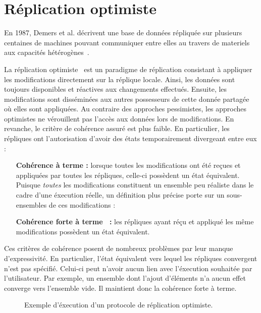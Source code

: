 \section{Réplication optimiste}
\label{repl:sec:optimistic}

En 1987, Demers et al. décrivent une base de données répliquée sur plusieurs
centaines de machines pouvant communiquer entre elles au travers de materiels
aux capacités hétérogènes~\cite{demers1987epidemic}. 

La réplication optimiste~\cite{johnson1975maintenance, saito2005optimistic} est
un paradigme de réplication consistant à appliquer les modifications directement
sur la réplique locale.  Ainsi, les données sont toujours disponibles et
réactives aux changements effectués. Ensuite, les modifications sont disséminées
aux autres possesseurs de cette donnée partagée où elles sont appliquées. Au
contraire des approches pessimistes, les approches optimistes ne vérouillent pas
l'accès aux données lors de modifications. En revanche, le critère de cohérence
assuré est plus faible. En particulier, les répliques ont l'autorisation d'avoir
des états temporairement divergeant entre eux :

\begin{itemize}
\item [\textbf{Cohérence à terme :}] lorsque toutes les modifications ont été
  reçues et appliquées par toutes les répliques, celle-ci possèdent un état
  équivalent. Puisque \emph{toutes} les modifications constituent un ensemble
  peu réaliste dans le cadre d'une éxecution réelle, un définition plus précise
  porte sur un sous-ensembles de ces modifications :
\item [\textbf{Cohérence forte à terme~\cite{shapiro2011conflict} :}] les
  répliques ayant réçu et appliqué les même modifications possèdent un état
  équivalent.
\end{itemize}

Ces critères de cohérence posent de nombreux problèmes par leur manque
d'expressivité. En particulier, l'état équivalent vers lequel les répliques
convergent n'est pas spécifié. Celui-ci peut n'avoir aucun lien avec l'éxecution
souhaitée par l'utilisateur. Par exemple, un ensemble dont l'ajout d'éléments
n'a aucun effet converge vers l'ensemble vide. Il maintient donc la cohérence
forte à terme.

\begin{figure}
  \centering
  
  \caption{\label{repl:fig:optimisticexample} Exemple d'éxecution d'un protocole
    de réplication optimiste.}
\end{figure}

